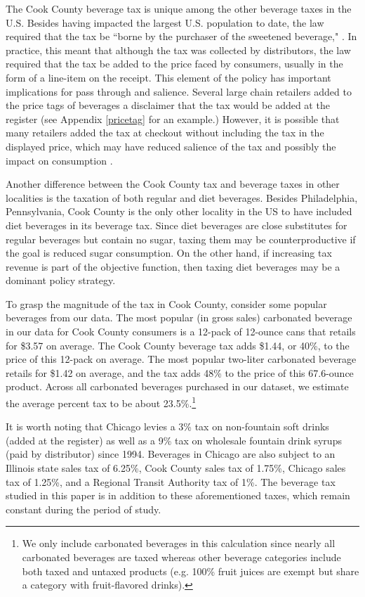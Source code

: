 \documentclass[12pt]{article}
\begin{document}
The Cook County beverage tax is unique among the other beverage taxes in the U.S. Besides having impacted the largest U.S. population to date, the law required that the tax be ``borne by the purchaser of the sweetened beverage," \parencite{cookcounty2016}. In practice, this meant that although the tax was collected by distributors, the law required that the tax be added to the price faced by consumers, usually in the form of a line-item on the receipt. This element of the policy has important implications for pass through and salience. Several large chain retailers added to the price tags of beverages a disclaimer that the tax would be added at the register (see Appendix \ref{pricetag} for an example.) However, it is possible that many retailers added the tax at checkout without including the tax in the displayed price, which may have reduced salience of the tax and possibly the impact on consumption \parencite{chetty2009salience}.

Another difference between the Cook County tax and beverage taxes in other localities is the taxation of both regular and diet beverages. Besides Philadelphia, Pennsylvania, Cook County is the only other locality in the US to have included diet beverages in its beverage tax. Since diet beverages are close substitutes for regular beverages but contain no sugar, taxing them may be counterproductive if the goal is reduced sugar consumption. On the other hand, if increasing tax revenue is part of the objective function, then taxing diet beverages may be a dominant policy strategy.

To grasp the magnitude of the tax in Cook County, consider some popular beverages from our data. The most popular (in gross sales) carbonated beverage in our data for Cook County consumers is a 12-pack of 12-ounce cans that retails for \$3.57 on average. The Cook County beverage tax adds \$1.44, or 40\%, to the price of this 12-pack on average. The most popular two-liter carbonated beverage retails for \$1.42 on average, and the tax adds 48\% to the price of this 67.6-ounce product. Across all carbonated beverages purchased in our dataset, we estimate the average percent tax to be about 23.5\%.\footnote{We only include carbonated beverages in this calculation since nearly all carbonated beverages are taxed whereas other beverage categories include both taxed and untaxed products (e.g. 100\% fruit juices are exempt but share a category with fruit-flavored drinks).}

It is worth noting that Chicago levies a 3\% tax on non-fountain soft drinks (added at the register) as well as a 9\% tax on wholesale fountain drink syrups (paid by distributor) since 1994. Beverages in Chicago are also subject to an Illinois state sales tax of 6.25\%, Cook County sales tax of 1.75\%, Chicago sales tax of 1.25\%, and a Regional Transit Authority tax of 1\%. The beverage tax studied in this paper is in addition to these aforementioned taxes, which remain constant during the period of study.
\end{document}
